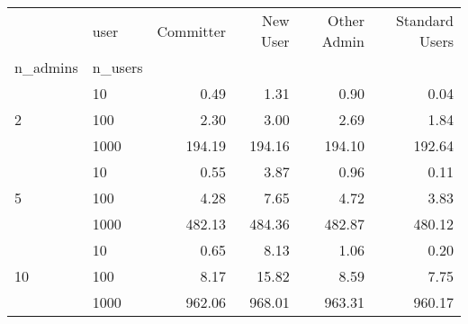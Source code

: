 \begin{tabular}{llrrrr}
\toprule
 & user & Committer & New User & Other Admin & Standard Users \\
n_admins & n_users &  &  &  &  \\
\midrule
\multirow[t]{3}{*}{2} & 10 & 0.49 & 1.31 & 0.90 & 0.04 \\
 & 100 & 2.30 & 3.00 & 2.69 & 1.84 \\
 & 1000 & 194.19 & 194.16 & 194.10 & 192.64 \\
\cline{1-6}
\multirow[t]{3}{*}{5} & 10 & 0.55 & 3.87 & 0.96 & 0.11 \\
 & 100 & 4.28 & 7.65 & 4.72 & 3.83 \\
 & 1000 & 482.13 & 484.36 & 482.87 & 480.12 \\
\cline{1-6}
\multirow[t]{3}{*}{10} & 10 & 0.65 & 8.13 & 1.06 & 0.20 \\
 & 100 & 8.17 & 15.82 & 8.59 & 7.75 \\
 & 1000 & 962.06 & 968.01 & 963.31 & 960.17 \\
\cline{1-6}
\bottomrule
\end{tabular}
